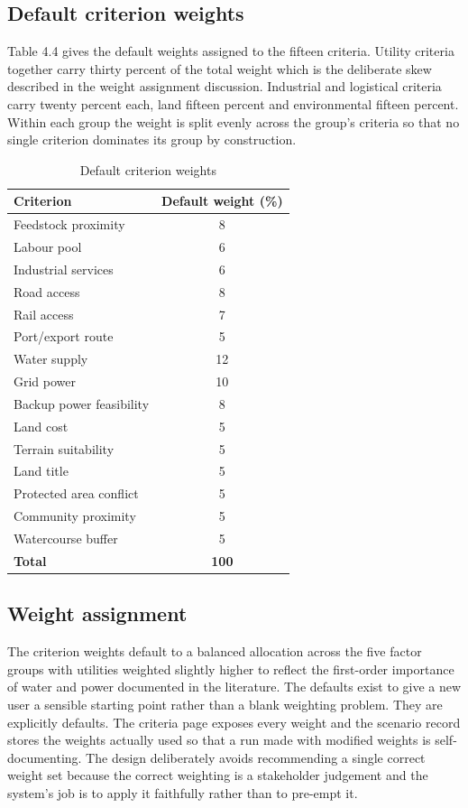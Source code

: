 \documentclass[12pt,a4paper]{report}
\begin{document}
\subsection{Default criterion weights}
Table 4.4 gives the default weights assigned to the fifteen criteria.
Utility criteria together carry thirty percent of the total weight
which is the deliberate skew described in the weight assignment
discussion. Industrial and logistical criteria carry twenty percent
each, land fifteen percent and environmental fifteen percent. Within
each group the weight is split evenly across the group's criteria so
that no single criterion dominates its group by construction.

\begin{table}[h]
\centering
\caption{Default criterion weights}
\begin{tabular}{lc}
\toprule
Criterion & Default weight (\%) \\
\midrule
Feedstock proximity & 8 \\
Labour pool & 6 \\
Industrial services & 6 \\
Road access & 8 \\
Rail access & 7 \\
Port/export route & 5 \\
Water supply & 12 \\
Grid power & 10 \\
Backup power feasibility & 8 \\
Land cost & 5 \\
Terrain suitability & 5 \\
Land title & 5 \\
Protected area conflict & 5 \\
Community proximity & 5 \\
Watercourse buffer & 5 \\
\midrule
\textbf{Total} & \textbf{100} \\
\bottomrule
\end{tabular}
\end{table}

\subsection{Weight assignment}
The criterion weights default to a balanced allocation across the five
factor groups with utilities weighted slightly higher to reflect the
first-order importance of water and power documented in the literature.
The defaults exist to give a new user a sensible starting point rather
than a blank weighting problem. They are explicitly defaults. The
criteria page exposes every weight and the scenario record stores the
weights actually used so that a run made with modified weights is
self-documenting. The design deliberately avoids recommending a
single correct weight set because the correct weighting is a
stakeholder judgement and the system's job is to apply it faithfully
rather than to pre-empt it.
\end{document}
